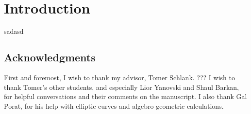\section{Introduction}

sadasd



\subsection{Acknowledgments}

First and foremost, I wish to thank my advisor, Tomer Schlank.
???
I wish to thank Tomer's other students, and especially Lior Yanovski and Shaul Barkan, for helpful conversations and their comments on the manuscript.
I also thank Gal Porat, for his help with elliptic curves and algebro-geometric calculations.